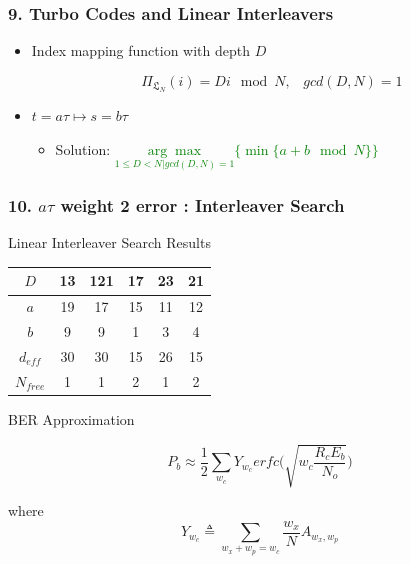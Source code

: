 \documentclass{beamer}  %
\begin{document}

\begin{frame}
\frametitle{9. Turbo Codes and Linear Interleavers}

\begin{itemize}
\setlength\itemsep{2em}
\item Index mapping function with depth $D$

\begin{equation}
 \Pi_{\mathfrak{L}_N}(i) = Di \mod N , \,\,\,\,\, gcd(D,N)=1
\end{equation}

 \item $t=a\tau \mapsto s=b\tau$
 
\begin{itemize}
\item Solution:  \textcolor{green}{$\underset{1 \leq D < N | gcd(D,N)=1}{\arg\max}\Bigg\{ \min \{a + b \mod N\}\Bigg\}$}
\end{itemize}
\end{itemize}

\end{frame}


\begin{frame}
\frametitle{10. $a\tau$ weight 2 error : Interleaver Search}
\begin{block}{Linear Interleaver Search Results}
\begin{table}[h!]
\centering
\begin{tabular}{||c |c |c |c |c |c ||} 
 \hline
 $D$ & 13 & 121 & 17 & 23 & 21\\ [0.5ex] 
 \hline\hline
 $a $ & 19 & 17 & 15 & 11 & 12 \\ 
 \hline
  $b $ & 9 & 9 & 1 & 3 & 4 \\ 
  \hline
  $d_{eff} $ & 30 & 30 & 15 & 26 & 15 \\ 
  \hline
  $N_{free}$ & 1 & 1 & 2 & 1 & 2 \\ [1ex] 
 \hline
\end{tabular}
\label{tab1}
\end{table}
\end{block}

\begin{block}{ BER Approximation}


\begin{equation} 
 P_b \approx \frac{1}{2}\sum_{w_c}Y_{w_c} 
  erfc \Bigg(\sqrt{w_c\frac{R_cE_b}{N_o}} \Bigg)
  \label{aprox}
  \end{equation}
  
 where 
  $$ Y_{w_c}\triangleq \sum_{w_x+w_p=w_c} \frac{w_x}{N}A_{w_x,w_p}$$
\end{block}
\end{frame}
\end{document}
